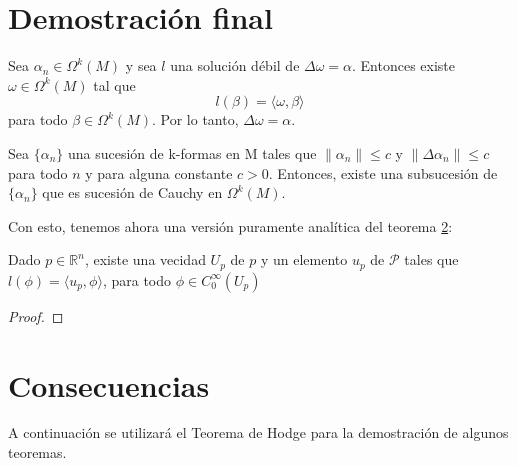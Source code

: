 \section{Demostración final}%

\begin{teo}[Regularidad]
Sea $\alpha_n \in \Omega^k(M)$ y sea $l$ una solución débil de $\Delta\omega = \alpha$. Entonces existe $\omega \in \Omega^k(M)$ tal que
\[l(\beta) = \langle \omega, \beta\rangle\]
para todo $\beta \in \Omega^k(M)$. Por lo tanto, $\Delta\omega = \alpha$.
\end{teo}


\begin{teo}
Sea $\{\alpha_n\}$ una sucesión de k-formas en M tales que $\|\alpha_n\| \leq c$ y $\|\Delta\alpha_n\| \leq c$ para todo $n$ y para alguna constante $c > 0$. Entonces, existe una subsucesión de $\{\alpha_n\}$ que es sucesión de Cauchy en $\Omega^k(M)$.
\end{teo}


Con esto, tenemos ahora una versión puramente analítica del teorema \ref{}:


\begin{teo}[Regularidad]
Dado $p \in \mathbb{R}^n$, existe una vecidad $U_p$ de $p$ y un elemento $u_p$ de $\mathcal{P}$ tales que $l(\phi) = \langle u_p, \phi\rangle$, para todo $\phi \in C_0^\infty(U_p)$
\end{teo}

\begin{proof}

\end{proof}



%
\section{Consecuencias}%
A continuación se utilizará el Teorema de Hodge para la demostración de algunos teoremas.
